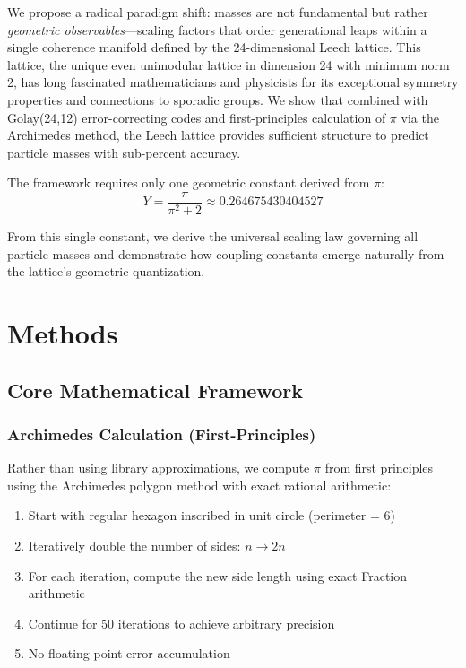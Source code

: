 \documentclass[11pt,twocolumn]{article}
\begin{document}
We propose a radical paradigm shift: masses are not fundamental but rather \textit{geometric observables}—scaling factors that order generational leaps within a single coherence manifold defined by the 24-dimensional Leech lattice. This lattice, the unique even unimodular lattice in dimension 24 with minimum norm 2, has long fascinated mathematicians and physicists for its exceptional symmetry properties and connections to sporadic groups. We show that combined with Golay(24,12) error-correcting codes and first-principles calculation of $\pi$ via the Archimedes method, the Leech lattice provides sufficient structure to predict particle masses with sub-percent accuracy.

The framework requires only one geometric constant derived from $\pi$:
\begin{equation}
Y = \frac{\pi}{\pi^2 + 2} \approx 0.264675430404527
\end{equation}

From this single constant, we derive the universal scaling law governing all particle masses and demonstrate how coupling constants emerge naturally from the lattice's geometric quantization.

\section{Methods}

\subsection{Core Mathematical Framework}

\subsubsection{Archimedes \pi  Calculation (First-Principles)}

Rather than using library approximations, we compute $\pi$ from first principles using the Archimedes polygon method with exact rational arithmetic:

\begin{enumerate}
\item Start with regular hexagon inscribed in unit circle (perimeter = 6)
\item Iteratively double the number of sides: $n \to 2n$
\item For each iteration, compute the new side length using exact Fraction arithmetic
\item Continue for 50 iterations to achieve arbitrary precision
\item No floating-point error accumulation
\end{enumerate}
\end{document}
